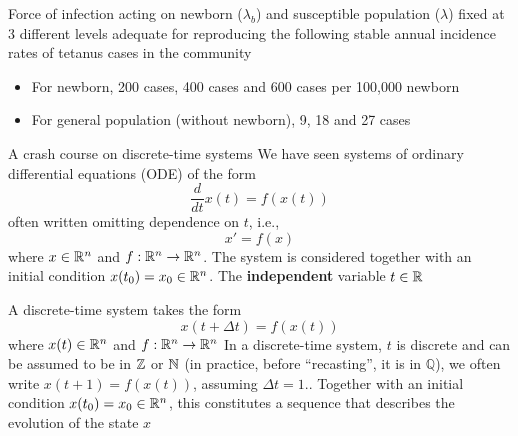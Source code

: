 \documentclass[aspectratio=169]{beamer}
\begin{document}
\begin{frame}
  Force of infection acting on newborn ($\lambda_b$) and susceptible population ($\lambda$) fixed at 3 different levels adequate for reproducing the following stable annual incidence rates of tetanus cases in the community
  \begin{itemize}
    \item For newborn, 200 cases, 400 cases and 600 cases per 100,000 newborn
    \item For general population (without newborn), 9, 18 and 27 cases
  \end{itemize}
\end{frame}

\begin{frame}{A crash course on discrete-time systems}
  We have seen systems of ordinary differential equations (ODE) of the form 
  \[
    \frac{d}{dt}x(t)=f(x(t))
  \]
  often written omitting dependence on $t$, i.e.,
  \begin{equation}\label{eq:ODE}
    x' = f(x)
  \end{equation}
  where $x\in\mathbb{R}^n$ and $f:\mathbb{R}^n\to\mathbb{R}^n$. The system is considered together with an initial condition $x(t_0)=x_0\in\mathbb{R}^n$.
  \vfill
  The \textbf{independent} variable $t\in\mathbb{R}$
\end{frame}

\begin{frame}
  A discrete-time system takes the form
  \begin{equation}\label{eq:DTS}
    x(t+\Delta t) = f(x(t))
  \end{equation}
  where $x(t)\in\mathbb{R}^n$ and $f:\mathbb{R}^n\to\mathbb{R}^n$
  \vfill
  In a discrete-time system, $t$ is discrete and can be assumed to be in $\mathbb{Z}$ or $\mathbb{N}$ (in practice, before ``recasting'', it is in $\mathbb{Q}$), we often write $x(t+1)=f(x(t))$, assuming $\Delta t=1$..
  \vfill
  Together with an initial condition $x(t_0)=x_0\in\mathbb{R}^n$, this constitutes a sequence that describes the evolution of the state $x$
\end{frame}
\end{document}
